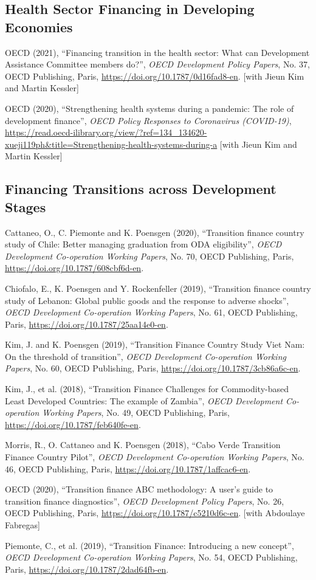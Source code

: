 \documentclass[a4paper, english, 10pt]{cv_class}
\begin{document}
\subsection{Health Sector Financing in Developing Economies}

OECD (2021), ``Financing transition in the health sector: What can Development Assistance Committee members do?'', \textit{OECD Development Policy Papers}, No. 37, OECD Publishing, Paris, \url{https://doi.org/10.1787/0d16fad8-en}.  [with Jieun Kim and Martin Kessler]

OECD (2020), ``Strengthening health systems during a pandemic: The role of development finance'', \textit{OECD Policy Responses to Coronavirus (COVID-19)}, \url{https://read.oecd-ilibrary.org/view/?ref=134_134620-xueji119ph&title=Strengthening-health-systems-during-a} [with Jieun Kim and Martin Kessler]

\subsection{Financing Transitions across Development Stages}

Cattaneo, O., C. Piemonte and K. Poensgen (2020), ``Transition finance country study of Chile: Better managing graduation from ODA eligibility'', \textit{OECD Development Co-operation Working Papers}, No. 70, OECD Publishing, Paris, \url{https://doi.org/10.1787/608cbf6d-en}.

Chiofalo, E., K. Poensgen and Y. Rockenfeller (2019), ``Transition finance country study of Lebanon: Global public goods and the response to adverse shocks'', \textit{OECD Development Co-operation Working Papers}, No. 61, OECD Publishing, Paris, \url{https://doi.org/10.1787/25aa14e0-en}.

Kim, J. and K. Poensgen (2019), ``Transition Finance Country Study Viet Nam: On the threshold of transition'', \textit{OECD Development Co-operation Working Papers}, No. 60, OECD Publishing, Paris, \url{https://doi.org/10.1787/3cb86a6c-en}.

Kim, J., et al. (2018), ``Transition Finance Challenges for Commodity-based Least Developed Countries: The example of Zambia'', \textit{OECD Development Co-operation Working Papers}, No. 49, OECD Publishing, Paris, \url{https://doi.org/10.1787/feb640fe-en}.

Morris, R., O. Cattaneo and K. Poensgen (2018), ``Cabo Verde Transition Finance Country Pilot'', \textit{OECD Development Co-operation Working Papers}, No. 46, OECD Publishing, Paris, \url{https://doi.org/10.1787/1affcac6-en}.

OECD (2020), ``Transition finance ABC methodology: A user’s guide to transition finance diagnostics'', \textit{OECD Development Policy Papers}, No. 26, OECD Publishing, Paris, \url{https://doi.org/10.1787/c5210d6c-en}. [with Abdoulaye Fabregas]

Piemonte, C., et al. (2019), ``Transition Finance: Introducing a new concept'', \textit{OECD Development Co-operation Working Papers}, No. 54, OECD Publishing, Paris, \url{https://doi.org/10.1787/2dad64fb-en}.


\end{document}

